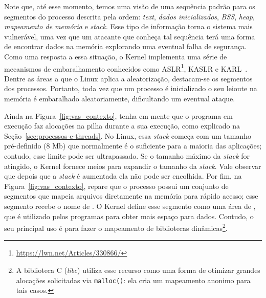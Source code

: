 Note que, até esse momento, temos uma visão de uma sequência padrão para os
segmentos do processo descrita pela ordem: \emph{text}, \emph{dados
inicializados}, \emph{BSS}, \emph{heap}, \emph{mapeamento de memória} e
\emph{stack}. Esse tipo de informação torna o sistema mais vulnerável, uma vez
que um atacante que conheça tal sequência terá uma forma de encontrar dados na
memória explorando uma eventual falha de segurança. Como uma resposta a essa situação,
o Kernel implementa uma série de mecanismos de embaralhamento
conhecidos como ASLR\footnote{\url{https://lwn.net/Articles/330866/}}, KASLR e
KARL~\citep{kaslr}. Dentre as áreas a que o Linux aplica a aleatorização,
destacam-se os segmentos dos processos. Portanto, toda vez que um processo é
inicializado o seu leioute na memória é embaralhado aleatoriamente, dificultando um eventual
ataque.

Ainda na Figura~\ref{fig:vas_contexto}, tenha em mente que o programa em
execução faz alocações na pilha durante a sua execução, como explicado
na Seção~\ref{sec:processos-e-threads}. No Linux, essa \textit{stack} começa
com um tamanho pré-definido (8 Mb) que normalmente é o suficiente para a
maioria das aplicações; contudo, esse limite pode ser ultrapassado. Se o
tamanho máximo da \textit{stack} for atingido, o Kernel fornece meios para
expandir o tamanho da \emph{stack}. Vale observar que depois que a
\textit{stack} é aumentada ela não pode ser encolhida. Por fim, na
Figura~\ref{fig:vas_contexto}, repare que o processo possui um conjunto de
segmentos que mapeia arquivos diretamente na memória para rápido acesso; esse
segmento recebe o nome de . O Kernel
define esse segmento como uma área de , que é
utilizado pelos programas para obter mais espaço para dados. Contudo, o seu
principal uso é para fazer o mapeamento de bibliotecas dinâmicas\footnote{A
biblioteca C (\textit{libc}) utiliza esse recurso como uma forma de otimizar
grandes alocações solicitadas via \texttt{malloc()}: ela cria um mapeamento
anonimo para tais casos.}.

